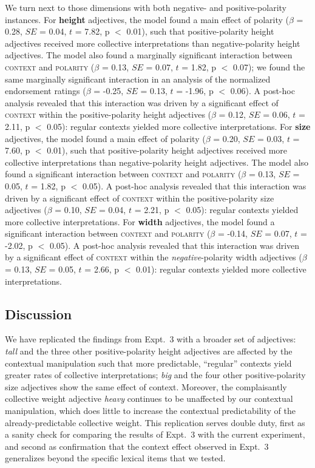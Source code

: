 \documentclass[preprint,12pt,authoryear,titlepage]{elsarticle}
\begin{document}
We turn next to those dimensions with both negative- and positive-polarity instances. For \textbf{height} adjectives, the model found a main effect of polarity ($\beta$ = 0.28, $SE$ = 0.04, $t$ = 7.82, p $<$ 0.01), such that positive-polarity height adjectives received more collective interpretations than negative-polarity height adjectives. The model also found a marginally significant interaction between \textsc{context} and \textsc{polarity} ($\beta$ = 0.13, $SE$ = 0.07, $t$ = 1.82, p $<$ 0.07); we found the same marginally significant interaction in an analysis of the normalized endorsement ratings ($\beta$ = -0.25, $SE$ = 0.13, $t$ = -1.96, p $<$ 0.06). A post-hoc analysis revealed that this interaction was driven by a significant effect of \textsc{context} within the positive-polarity height adjectives ($\beta$ = 0.12, $SE$ = 0.06, $t$ = 2.11, p $<$ 0.05): regular contexts yielded more collective interpretations. For \textbf{size} adjectives, the model found a main effect of polarity ($\beta$ = 0.20, $SE$ = 0.03, $t$ = 7.60, p $<$ 0.01), such that positive-polarity height adjectives received more collective interpretations than negative-polarity height adjectives. The model also found a significant interaction between \textsc{context} and \textsc{polarity} ($\beta$ = 0.13, $SE$ = 0.05, $t$ = 1.82, p $<$ 0.05). A post-hoc analysis revealed that this interaction was driven by a significant effect of \textsc{context} within the positive-polarity size adjectives ($\beta$ = 0.10, $SE$ = 0.04, $t$ = 2.21, p $<$ 0.05): regular contexts yielded more collective interpretations.
For \textbf{width} adjectives, the model found a significant interaction between \textsc{context} and \textsc{polarity} ($\beta$ = -0.14, $SE$ = 0.07, $t$ = -2.02, p $<$ 0.05). A post-hoc analysis revealed that this interaction was driven by a significant effect of \textsc{context} within the \emph{negative}-polarity width adjectives ($\beta$ = 0.13, $SE$ = 0.05, $t$ = 2.66, p $<$ 0.01): regular contexts yielded more collective interpretations.


\subsection{Discussion}

We have replicated the findings from Expt.~3 with a broader set of adjectives: \emph{tall} and the three other positive-polarity height adjectives are affected by the contextual manipulation such that more predictable, ``regular'' contexts yield greater rates of collective interpretations; \emph{big} and the four other positive-polarity size adjectives show the same effect of context. Moreover, the complaisantly collective weight adjective \emph{heavy} continues to be unaffected by our contextual manipulation, which does little to increase the contextual predictability of the already-predictable collective weight. This replication serves double duty, first as a sanity check for comparing the results of Expt.~3 with the current experiment, and second as confirmation that the context effect observed in Expt.~3 generalizes beyond the specific lexical items that we tested. 
\end{document}
